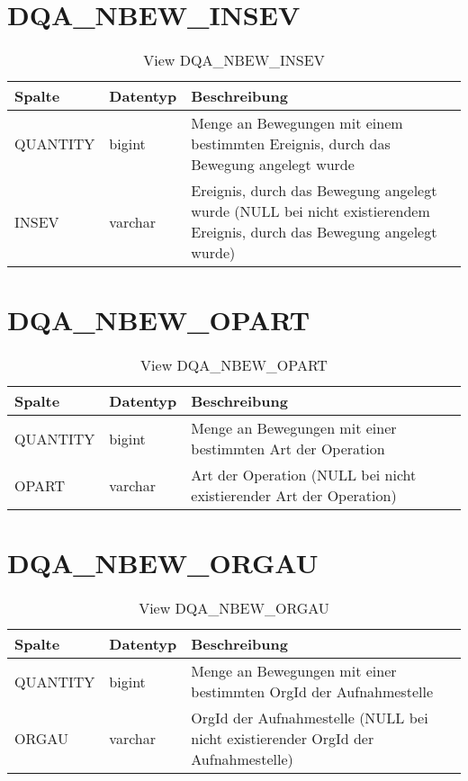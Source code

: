   \section{DQA\_NBEW\_INSEV}

  \begin{table}[ht]
    \centering
    \caption{View DQA\_NBEW\_INSEV}
    \label{tab:dqanbewinsev}
    \begin{tabular}{||l|l|p{10cm}||}
      \hline
      Spalte & Datentyp & Beschreibung \\ [0.5ex] \hline \hline
QUANTITY & bigint & Menge an Bewegungen mit einem bestimmten Ereignis, durch das Bewegung angelegt wurde \\ \hline
INSEV & varchar & Ereignis, durch das Bewegung angelegt wurde (NULL bei nicht existierendem Ereignis, durch das Bewegung angelegt wurde)\\ \hline
    \end{tabular}
  \end{table}
 
  \section{DQA\_NBEW\_OPART}

  \begin{table}[ht]
    \centering
    \caption{View DQA\_NBEW\_OPART}
    \label{tab:dqanbewopart}
    \begin{tabular}{||l|l|p{10cm}||}
      \hline
      Spalte & Datentyp & Beschreibung \\ [0.5ex] \hline \hline
QUANTITY & bigint & Menge an Bewegungen mit einer bestimmten Art der Operation \\ \hline
OPART & varchar & Art der Operation (NULL bei nicht existierender Art der Operation)\\ \hline
    \end{tabular}
  \end{table}

  \section{DQA\_NBEW\_ORGAU}

  \begin{table}[ht]
    \centering
    \caption{View DQA\_NBEW\_ORGAU}
    \label{tab:dqanbeworgau}
    \begin{tabular}{||l|l|p{10cm}||}
      \hline
      Spalte & Datentyp & Beschreibung \\ [0.5ex] \hline \hline
QUANTITY & bigint & Menge an Bewegungen mit einer bestimmten OrgId der Aufnahmestelle \\ \hline
ORGAU & varchar & OrgId der Aufnahmestelle (NULL bei nicht existierender OrgId der Aufnahmestelle)\\ \hline
    \end{tabular}
  \end{table}

